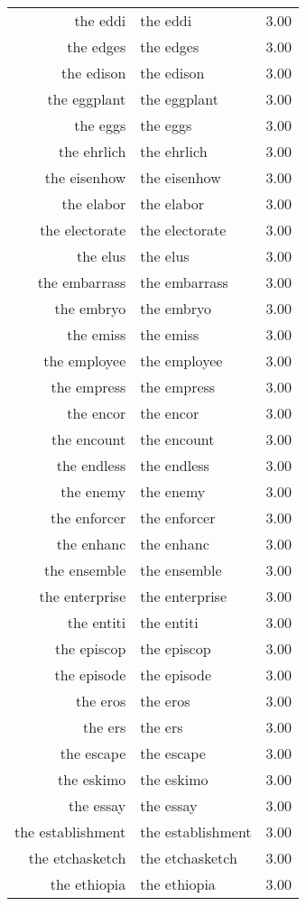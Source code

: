 \begin{table}[ht]
\begin{tabular}{rlr}
  the eddi & the eddi & 3.00 \\ 
  the edges & the edges & 3.00 \\ 
  the edison & the edison & 3.00 \\ 
  the eggplant & the eggplant & 3.00 \\ 
  the eggs & the eggs & 3.00 \\ 
  the ehrlich & the ehrlich & 3.00 \\ 
  the eisenhow & the eisenhow & 3.00 \\ 
  the elabor & the elabor & 3.00 \\ 
  the electorate & the electorate & 3.00 \\ 
  the elus & the elus & 3.00 \\ 
  the embarrass & the embarrass & 3.00 \\ 
  the embryo & the embryo & 3.00 \\ 
  the emiss & the emiss & 3.00 \\ 
  the employee & the employee & 3.00 \\ 
  the empress & the empress & 3.00 \\ 
  the encor & the encor & 3.00 \\ 
  the encount & the encount & 3.00 \\ 
  the endless & the endless & 3.00 \\ 
  the enemy & the enemy & 3.00 \\ 
  the enforcer & the enforcer & 3.00 \\ 
  the enhanc & the enhanc & 3.00 \\ 
  the ensemble & the ensemble & 3.00 \\ 
  the enterprise & the enterprise & 3.00 \\ 
  the entiti & the entiti & 3.00 \\ 
  the episcop & the episcop & 3.00 \\ 
  the episode & the episode & 3.00 \\ 
  the eros & the eros & 3.00 \\ 
  the ers & the ers & 3.00 \\ 
  the escape & the escape & 3.00 \\ 
  the eskimo & the eskimo & 3.00 \\ 
  the essay & the essay & 3.00 \\ 
  the establishment & the establishment & 3.00 \\ 
  the etchasketch & the etchasketch & 3.00 \\ 
  the ethiopia & the ethiopia & 3.00 \\ 

\end{tabular}
\end{table}
